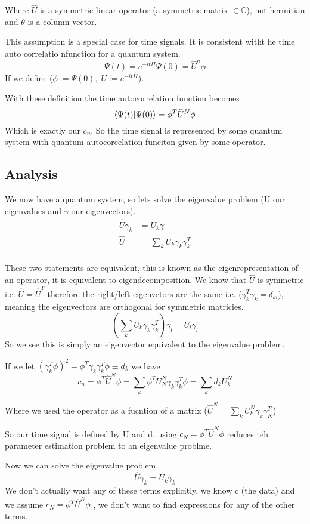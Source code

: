 \documentclass{article}
\newcommand{\be}{\begin{equation}}
\newcommand{\ee}{\end{equation}}
\begin{document}
Where $\widehat{U}$ is a symmetric linear operator (a symmetric matrix $\in \mathbb{C}$), not hermitian and $\theta$ is a column vector. 

This assumption is a special case for time signals.  
It is consistent witht he time auto correlatio nfunction for a quantum system.
\be
\Psi(t) = e^{-it\widehat{H}} \Psi(0) = \widehat{U}^n\phi
\ee
If we define ($\phi:= \Psi(0), \; U:= e^{-it\widehat{H}}$).

With these definition the time autocorrelation function becomes
\be
\braket{\Psi(t)|\Psi(0)} = \phi^T\widehat{U}^N\phi
\ee
Which is exactly our $c_n$. 
So the time signal is represented by some quantum system with quantum autocoreelation funciton given by some operator. 

\subsection{Analysis}
We now have a quantum system, so lets solve the eigenvalue problem (U our eigenvalues and $\gamma$ our eigenvectors). 
\be
\begin{split}
    \widehat{U}\gamma_k&=U_k\gamma\\
    \widehat{U}&=\sum_kU_k\gamma_k\gamma_k^T\\
\end{split}
\ee

These two statements are equivalent, this is known as the eigenrepresentation of an operator, it is equivalent to eigendecomposition. 
We know that $\widehat{U}$ is symmetric i.e. $\widehat{U}=\widehat{U}^T$ therefore the right/left eigenvetors are the same i.e. ($\gamma_k^T\gamma_k=\delta_{kl}$), meaning the eigenvectors are orthogonal for symmetric matricies. 
\be
\left( \sum_k U_k\gamma_k\gamma_k^T \right) \gamma_l = U_l\gamma_l
\ee
So we see this is simply an eigenvector equivalent to the eigenvalue problem. 

If we let $(\gamma_k^T\phi)^2 = \phi^T\gamma_k \gamma_k^T\phi \equiv d_k$ we have
\be
c_n = \phi^T\widehat{U}^N\phi = \sum_k \phi^T U_N^N \gamma_k\gamma_k^T\phi = \sum_k d_kU_k^N
\ee

Where we used the operator as a fucntion of a matrix ($\widehat{U}^N = \sum_k U_k^N\gamma_k\gamma_K^T$)

So our time signal is defined by U and d, using $c_N=\phi^T\widehat{U}^N\phi$ reduces teh parameter estimation problem to an eigenvalue problme. 

Now we can solve the eigenvalue problem. 
\be
\widehat{U}\gamma_k = U_k\gamma_k
\ee
We don't actually want any of these terms explicitly, we know c (the data) and we assume $c_N=\phi^T\widehat{U}^N\phi$ , we don't want to find expressions for any of the other terms.
\end{document}
